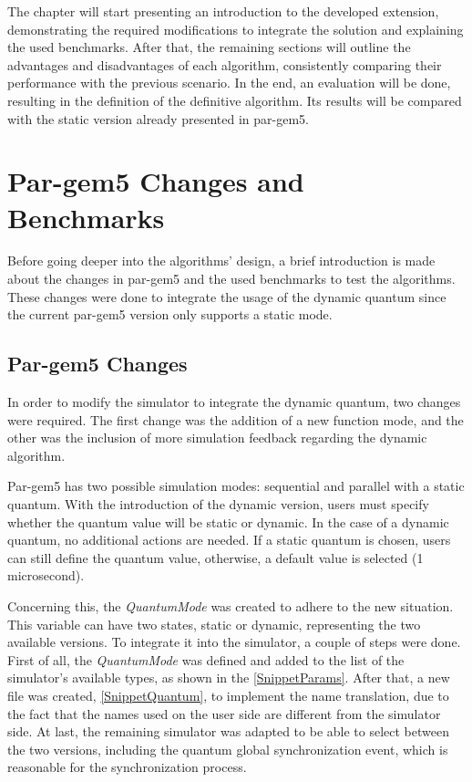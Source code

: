 The chapter will start presenting an introduction to the developed extension, demonstrating the required modifications to integrate the solution and 
explaining the used benchmarks. 
After that, the remaining sections will outline the advantages and disadvantages of each algorithm, consistently comparing their performance with the 
previous scenario. In the end, an evaluation will be done, resulting in the definition of the definitive algorithm. Its results will be compared with 
the static version already presented in par-gem5.


\section{Par-gem5 Changes and Benchmarks}


Before going deeper into the algorithms' design, a brief introduction is made about the changes in par-gem5 and the used benchmarks to test the 
algorithms. These changes were done to integrate the usage of the dynamic quantum since the current par-gem5 version only supports a static mode. 

\subsection{Par-gem5 Changes}

In order to modify the simulator to integrate the dynamic quantum, two changes were required. 
The first change was the addition of a new function mode, and the other was the inclusion of more simulation feedback regarding 
the dynamic algorithm. 

Par-gem5 has two possible simulation modes: sequential and parallel with a static quantum. With the introduction of the dynamic version, 
users must specify whether the quantum value will be static or dynamic. In the case of a dynamic quantum, no additional actions are needed. 
If a static quantum is chosen, users can still define the quantum value, otherwise, a default value is selected (1 microsecond). 

Concerning this, the \textit{QuantumMode} was created to adhere to the new situation. This variable can have two states, static or 
dynamic, representing the two available versions. To integrate it into the simulator, a couple of steps were done. 
First of all, the \textit{QuantumMode} was defined and added to the list of the simulator's available types, as shown in the \autoref{SnippetParams}. 
After that, a new file was created, \autoref{SnippetQuantum}, to implement the name translation, due to the fact that the names used on the user 
side are different from the simulator side. At last, the remaining simulator was adapted to be able to select between the two versions, 
including the quantum global synchronization event, which is reasonable for the synchronization process.

